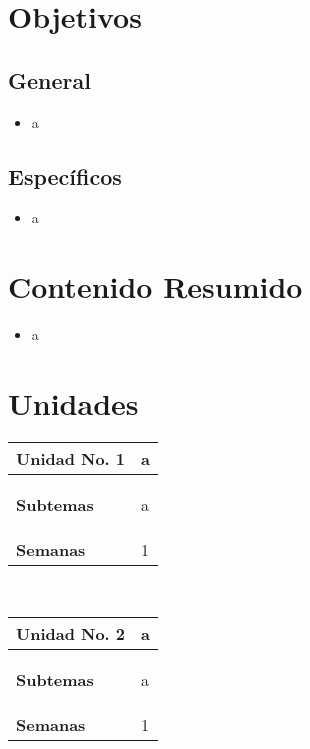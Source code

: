 \documentclass[11pt]{article}
\begin{document}
\section*{Objetivos}

\subsection*{General}

\begin{itemize}
\item a 
\end{itemize}

\subsection*{Específicos}

\begin{itemize}
\item a 
\end{itemize}

\section*{Contenido Resumido}

\begin{itemize}
\item a 
\end{itemize}

\section*{Unidades}
\noindent 
\begin{tabular}{R{0.16\textwidth} L{0.7\textwidth}} 
 \\ 
\toprule \textbf{Unidad No. 1} & a 
 \\ 
\midrule\textbf{Subtemas} & 
\begin{description}
 \item a 
\end{description}
 \\ 
\textbf{Semanas} & 1 
\end{tabular} 
 \\ 
 \begin{tabular}{R{0.16\textwidth} L{0.7\textwidth}} 
 \\ 
\toprule \textbf{Unidad No. 2} & a 
 \\ 
\midrule\textbf{Subtemas} & 
\begin{description}
 \item a 
\end{description}
 \\ 
\textbf{Semanas} & 1 
\end{tabular} 
 \\ 
 
\end{document}

